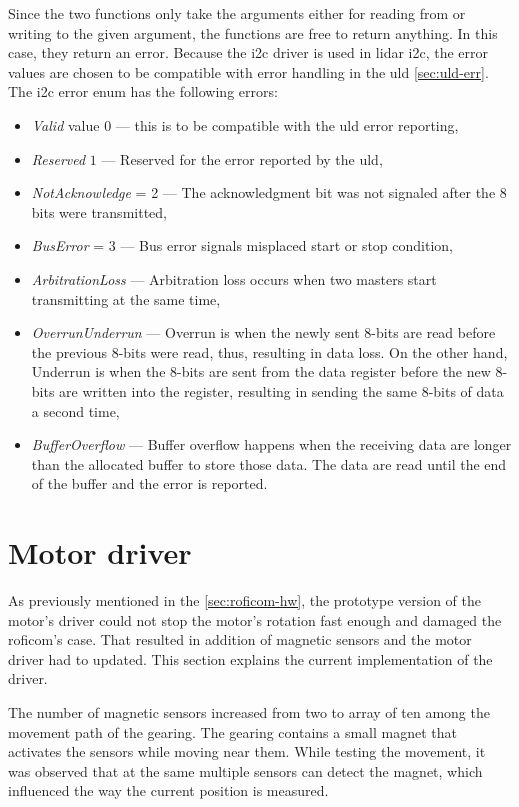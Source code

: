 \documentclass[
  digital,     %
  oneside,     %
  nosansbold,  %
  nocolorbold, %
  nolof,         %
  nolot,         %
]{fithesis4}
\begin{document}
{{{Since the two functions only take the arguments either for reading from or writing to the given argument, the functions are free to return anything. In this case, they return an error. Because the \acrshort{i2c} driver is used in \acrshort{lidar} \acrshort{i2c}, the error values are chosen to be compatible with error handling in the \acrshort{uld} \autoref{sec:uld-err}. The \acrshort{i2c} error enum has the following errors:
\begin{itemize}
    \item \emph{Valid} value $0$ --- this is to be compatible with the \acrshort{uld} error reporting,
    \item \emph{Reserved} $1$ --- Reserved for the error reported by the \acrshort{uld},
    \item \emph{NotAcknowledge} = 2 --- The acknowledgment bit was not signaled after the 8 bits were transmitted,
    \item \emph{BusError} = 3 --- Bus error signals misplaced start or stop condition,
    \item \emph{ArbitrationLoss} --- Arbitration loss occurs when two masters start transmitting at the same time,
    \item \emph{OverrunUnderrun} --- Overrun is when the newly sent 8-bits are read before the previous 8-bits were read, thus, resulting in data loss. On the other hand, Underrun is when the 8-bits are sent from the data register before the new 8-bits are written into the register, resulting in sending the same 8-bits of data a second time,
    \item \emph{BufferOverflow} --- Buffer overflow happens when the receiving data are longer than the allocated buffer to store those data. The data are read until the end of the buffer and the error is reported.
\end{itemize}

\section{ Motor driver }

As previously mentioned in the \autoref{sec:roficom-hw}, the prototype version of the motor's driver could not stop the motor's rotation fast enough and damaged the \acrshort{roficom}'s case. That resulted in addition of magnetic sensors and the motor driver had to updated. This section explains the current implementation of the driver.

The number of magnetic sensors increased from two to array of ten among the movement path of the gearing. The gearing contains a small magnet that activates the sensors while moving near them. While testing the movement, it was observed that at the same multiple sensors can detect the magnet, which influenced the way the current position is measured.

}}}
\end{document}
